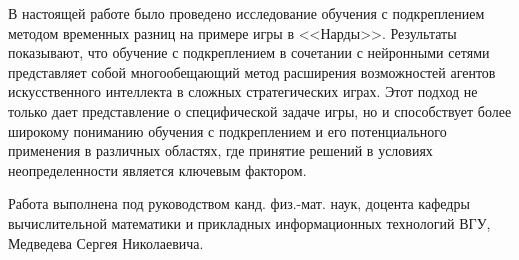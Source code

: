 В настоящей работе было проведено исследование обучения с подкреплением методом временных разниц на примере игры в <<Нарды>>. Результаты показывают, что обучение с подкреплением в сочетании с нейронными сетями представляет собой многообещающий метод расширения возможностей агентов искусственного интеллекта в сложных стратегических играх. Этот подход не только дает представление о специфической задаче игры, но и способствует более широкому пониманию обучения с подкреплением и его потенциального применения в различных областях, где принятие решений в условиях неопределенности является ключевым фактором.

Работа выполнена под руководством канд. физ.-мат. наук, доцента кафедры вычислительной математики и прикладных информационных технологий ВГУ, Медведева Сергея Николаевича.
